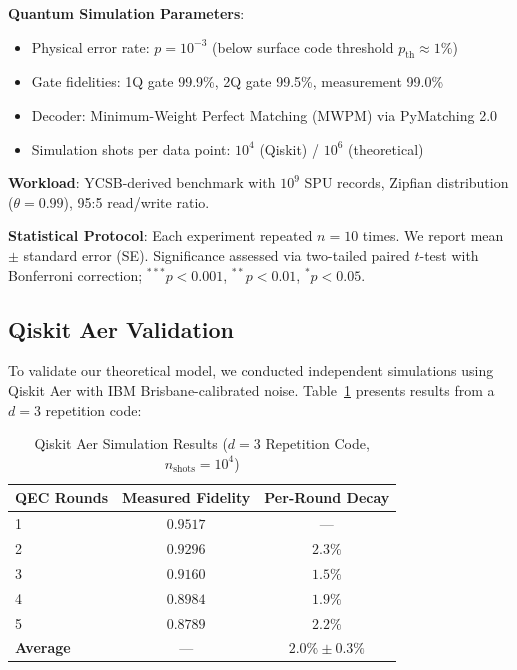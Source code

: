 \documentclass[12pt,a4paper]{article}
\theoremstyle{definition}
\begin{document}
\textbf{Quantum Simulation Parameters}:
\begin{itemize}
    \item Physical error rate: $p = 10^{-3}$ (below surface code threshold $p_{\text{th}} \approx 1\%$)
    \item Gate fidelities: 1Q gate 99.9\%, 2Q gate 99.5\%, measurement 99.0\%
    \item Decoder: Minimum-Weight Perfect Matching (MWPM) via PyMatching 2.0
    \item Simulation shots per data point: $10^4$ (Qiskit) / $10^6$ (theoretical)
\end{itemize}

\textbf{Workload}: YCSB-derived benchmark with $10^9$ SPU records, Zipfian distribution ($\theta = 0.99$), 95:5 read/write ratio.

\textbf{Statistical Protocol}: Each experiment repeated $n = 10$ times. We report mean $\pm$ standard error (SE). Significance assessed via two-tailed paired $t$-test with Bonferroni correction; $^{***}p < 0.001$, $^{**}p < 0.01$, $^{*}p < 0.05$.

\subsection{Qiskit Aer Validation}
To validate our theoretical model, we conducted independent simulations using Qiskit Aer with IBM Brisbane-calibrated noise. Table~\ref{tab:qiskit_validation} presents results from a $d=3$ repetition code:

\begin{table}[H]
\centering
\caption{Qiskit Aer Simulation Results ($d=3$ Repetition Code, $n_{\text{shots}}=10^4$)}
\label{tab:qiskit_validation}
\begin{tabular}{lcc}
\toprule
\textbf{QEC Rounds} & \textbf{Measured Fidelity} & \textbf{Per-Round Decay} \\
\midrule
1 & $0.9517$ & --- \\
2 & $0.9296$ & $2.3\%$ \\
3 & $0.9160$ & $1.5\%$ \\
4 & $0.8984$ & $1.9\%$ \\
5 & $0.8789$ & $2.2\%$ \\
\midrule
\textbf{Average} & --- & $\mathbf{2.0\% \pm 0.3\%}$ \\
\bottomrule
\end{tabular}
\end{table}
\end{document}
